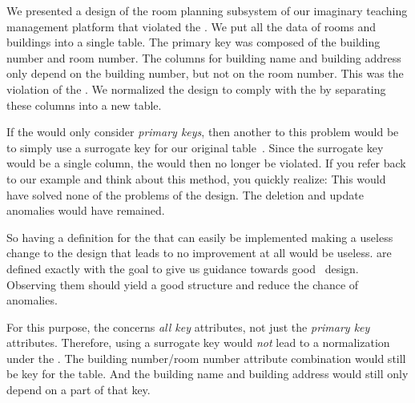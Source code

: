 We presented a design of the room planning subsystem of our imaginary teaching management platform that violated the .
We put all the data of rooms and buildings into a single table.
The primary key was composed of the building number and room number.
The columns for building name and building address only depend on the building number, but not on the room number.
This was the violation of the .
We normalized the design to comply with the  by separating these columns into a new table.

If the  would only consider \emph{primary keys}, then another  to this problem would be to simply use a surrogate key for our original table~.
Since the surrogate key would be a single column, the  would then no longer be violated.
If you refer back to our example and think about this method, you quickly realize:
This would have solved none of the problems of the design.
The deletion and update anomalies would have remained.

So having a definition for the  that can easily be implemented making a useless change to the design that leads to no improvement at all would be useless.
 are defined exactly with the goal to give us guidance towards good \db\ design.
Observing them should yield a good structure and reduce the chance of anomalies.

For this purpose, the  concerns \emph{all key} attributes, not just the \emph{primary key} attributes.
Therefore, using a surrogate key would \emph{not} lead to a normalization under the .
The building number/room number attribute combination would still be key for the table.
And the building name and building address would still only depend on a part of that key.%
\endhsection%
%
\endhsection%
%
